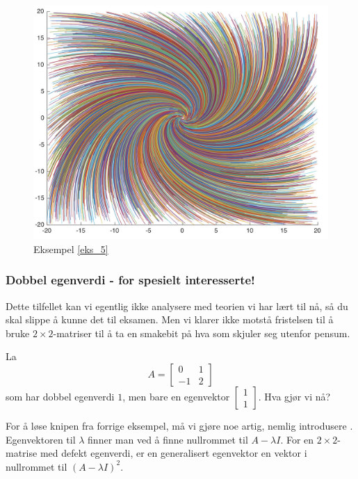 \begin{figure}[htbp]
  \begin{center}
	\includegraphics[scale=.1]{eks_5.jpg}
	\captionsetup{labelformat=empty}
	\caption{Eksempel \ref{eks_5}}
	\end{center}
\end{figure}
\subsubsection*{Dobbel egenverdi - for spesielt interesserte!}
Dette tilfellet kan vi egentlig ikke analysere med teorien vi har lært til nå, så du skal slippe å kunne det til eksamen. 
Men vi klarer ikke motstå fristelsen til å  bruke $2 \times 2$-matriser til å ta en smakebit på hva som skjuler seg utenfor pensum. 

\begin{ex}
La 
\[
A=
\begin{bmatrix}
0 & 1   \\
-1 & 2
\end{bmatrix}
\]
som har dobbel egenverdi $1$, men bare en egenvektor
$
\begin{bmatrix}
1  \\
1 
\end{bmatrix}
$.
Hva gjør vi nå?
\end{ex}

For å løse knipen fra forrige eksempel, må vi gjøre noe artig, nemlig introdusere . 
Egenvektoren til $\lambda$ finner man ved å finne nullrommet til $A-\lambda I$. 
For en $2 \times 2$-matrise med defekt egenverdi, er en generalisert egenvektor en vektor i nullrommet til $(A-\lambda I)^2$.

